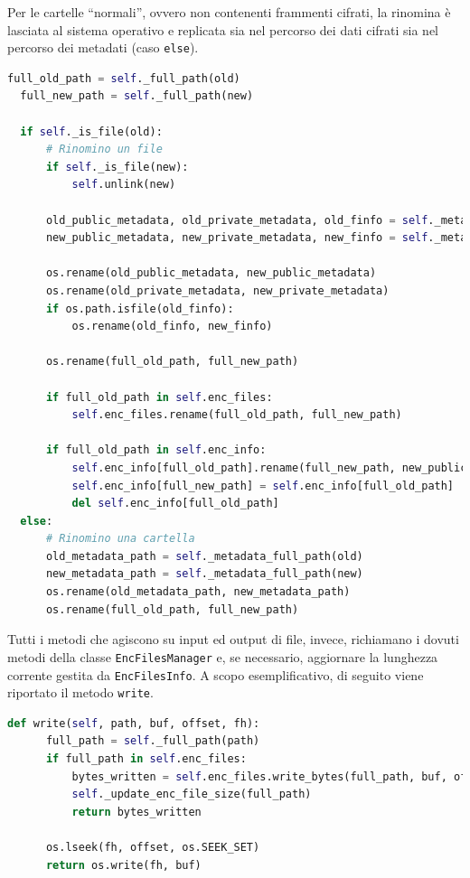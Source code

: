 \documentclass[a4paper,12pt,twoside,openright]{report}
\begin{document}
  Per le cartelle ``normali'', ovvero non contenenti frammenti cifrati,
  la rinomina è lasciata al sistema operativo e replicata sia
  nel percorso dei dati cifrati sia nel percorso dei metadati (caso \texttt{else}).
  \begin{lstlisting}[language=Python]
  full_old_path = self._full_path(old)
  full_new_path = self._full_path(new)

  if self._is_file(old):
      # Rinomino un file
      if self._is_file(new):
          self.unlink(new)

      old_public_metadata, old_private_metadata, old_finfo = self._metadata_names(old)
      new_public_metadata, new_private_metadata, new_finfo = self._metadata_names(new)

      os.rename(old_public_metadata, new_public_metadata)
      os.rename(old_private_metadata, new_private_metadata)
      if os.path.isfile(old_finfo):
          os.rename(old_finfo, new_finfo)

      os.rename(full_old_path, full_new_path)

      if full_old_path in self.enc_files:
          self.enc_files.rename(full_old_path, full_new_path)
      
      if full_old_path in self.enc_info:
          self.enc_info[full_old_path].rename(full_new_path, new_public_metadata, new_finfo)
          self.enc_info[full_new_path] = self.enc_info[full_old_path]
          del self.enc_info[full_old_path]
  else:
      # Rinomino una cartella
      old_metadata_path = self._metadata_full_path(old)
      new_metadata_path = self._metadata_full_path(new)            
      os.rename(old_metadata_path, new_metadata_path)
      os.rename(full_old_path, full_new_path)
  \end{lstlisting}

  Tutti i metodi che agiscono su input ed output di file, invece,
  richiamano i dovuti metodi della classe \texttt{EncFilesManager} e, se necessario, aggiornare
  la lunghezza corrente gestita da \texttt{EncFilesInfo}. A scopo esemplificativo, di seguito
  viene riportato il metodo \texttt{write}.

  \begin{lstlisting}[language=Python]
  def write(self, path, buf, offset, fh):
      full_path = self._full_path(path)
      if full_path in self.enc_files:
          bytes_written = self.enc_files.write_bytes(full_path, buf, offset)
          self._update_enc_file_size(full_path)
          return bytes_written

      os.lseek(fh, offset, os.SEEK_SET)
      return os.write(fh, buf)
  \end{lstlisting}
  
\end{document}
